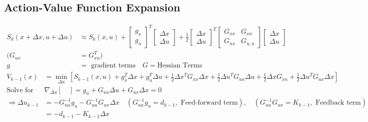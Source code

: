 \documentclass[11pt]{article}
\begin{document}
\subsection{Action-Value Function Expansion}
\begin{align*}
    S_k(x+\Delta x, u+\Delta u) &\approx S_k(x,u) + \begin{bmatrix}
        g_x \\
        g_u
    \end{bmatrix}^T
    \begin{bmatrix}
        \Delta x \\
        \Delta u
    \end{bmatrix}
    +
    \frac{1}{2}
    \begin{bmatrix}
        \Delta x \\
        \Delta u
    \end{bmatrix}^T
    \begin{bmatrix}
        G_{xx} & G_{xu} \\
        G_{ux} & G_{u,u}
    \end{bmatrix}
    \begin{bmatrix}
        \Delta x \\
        \Delta u
    \end{bmatrix}
    \\
    (G_{ux} &= G_{xu}^T)
    \\
    g &= \text{ gradient terms} \quad G=\text{Hessian Terms}
\end{align*}
\begin{align*}
    V_{k-1}(x) &= \min_{\Delta u} \left[ S_{k-1}(x,u) + g_x^T\Delta x + g_u^T\Delta u + \frac{1}{2} \Delta x^T G_{xx}\Delta x + \frac{1}{2}\Delta u^T G_{uu}\Delta u + \frac{1}{2}\Delta x G_{xu} + \frac{1}{2}\Delta u^TG_{ux}\Delta x\right]
    \\
    \text{Solve for } &\nabla_{\Delta u}[\quad] = g_u + G_{uu}\Delta u + G_{ux}\Delta x = 0
    \\
    \Rightarrow \Delta u_{k-1} &= -G_{uu}^{-1}g_u - G_{uu}^{-1}G_{ux}\Delta x
    \quad(G_{uu}^{-1}g_u = d_{k-1}, \text{ Feed-forward term}),
    \quad (G_{uu}^{-1}G_{ux} = K_{k-1}, \text{ Feedback term})
    \\
    &= -d_{k-1} - K_{k-1}\Delta x 
\end{align*}
\end{document}
